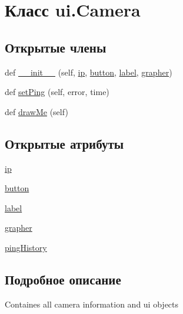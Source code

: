 \hypertarget{classui_1_1_camera}{}\section{Класс ui.\+Camera}
\label{classui_1_1_camera}
\subsection*{Открытые члены}
\begin{DoxyCompactItemize}
\item 
def \hyperlink{classui_1_1_camera_a57b0a706f72ec8877414cf9f38d0200e}{\+\_\+\+\_\+init\+\_\+\+\_\+} (self, \hyperlink{classui_1_1_camera_a3abc65d91421c37e93557714044bdf9a}{ip}, \hyperlink{classui_1_1_camera_aeec48b1317d4cbb0a35d41b0b02ab838}{button}, \hyperlink{classui_1_1_camera_aa3daa8e29e510ab75e6df4571469f9b1}{label}, \hyperlink{classui_1_1_camera_a3c90ee3bc847caf6e232e0c9c144ff81}{grapher})
\item 
def \hyperlink{classui_1_1_camera_ab80e266281042190e7c8cd49fb04ec3c}{set\+Ping} (self, error, time)
\item 
def \hyperlink{classui_1_1_camera_a2eb0686a9ed44e4b3f464c333dafee8d}{draw\+Me} (self)
\end{DoxyCompactItemize}
\subsection*{Открытые атрибуты}
\begin{DoxyCompactItemize}
\item 
\hyperlink{classui_1_1_camera_a3abc65d91421c37e93557714044bdf9a}{ip}
\item 
\hyperlink{classui_1_1_camera_aeec48b1317d4cbb0a35d41b0b02ab838}{button}
\item 
\hyperlink{classui_1_1_camera_aa3daa8e29e510ab75e6df4571469f9b1}{label}
\item 
\hyperlink{classui_1_1_camera_a3c90ee3bc847caf6e232e0c9c144ff81}{grapher}
\item 
\hyperlink{classui_1_1_camera_ab0bdd670ac88a1c9da82d106f4157cbb}{ping\+History}
\end{DoxyCompactItemize}


\subsection{Подробное описание}
\begin{DoxyVerb}Containes all camera information and ui objects\end{DoxyVerb}
 

